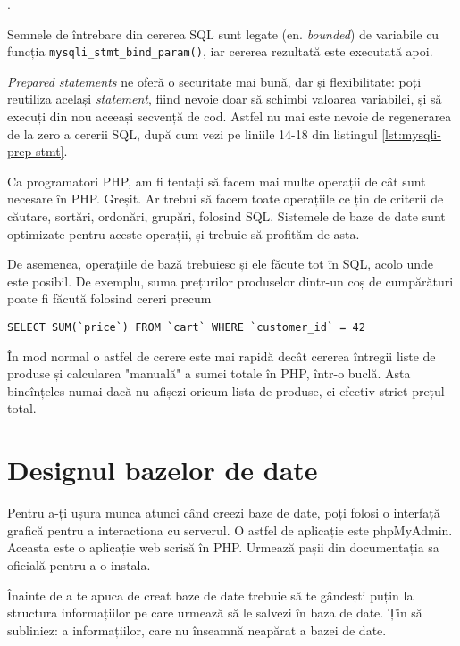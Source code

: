 .

Semnele de întrebare din cererea SQL sunt legate (en. \textsl{bounded})
de variabile cu funcția \texttt{mysqli\_stmt\_bind\_param()}, iar
cererea rezultată este executată apoi.

\textit{Prepared statements} ne oferă o securitate mai bună, dar și flexibilitate:
poți reutiliza același \textit{statement}, fiind nevoie doar să schimbi
valoarea variabilei, și să execuți din nou aceeași secvență de cod. Astfel
nu mai este nevoie de regenerarea de la zero a cererii SQL, după cum
vezi pe liniile 14-18 din listingul \ref{lst:mysqli-prep-stmt}.

Ca programatori PHP, am fi tentați să facem mai multe operații
de cât sunt necesare în PHP. Greșit. Ar trebui să facem toate
operațiile ce țin de criterii de căutare, sortări, ordonări, grupări,
folosind SQL. Sistemele de baze de date sunt optimizate pentru aceste
operații, și trebuie să profităm de asta.

De asemenea, operațiile de bază trebuiesc și ele făcute tot în SQL, acolo
unde este posibil. De exemplu, suma prețurilor produselor dintr-un
coș de cumpărături poate fi făcută folosind cereri precum

\begin{lstlisting}
SELECT SUM(`price`) FROM `cart` WHERE `customer_id` = 42
\end{lstlisting}

În mod normal o astfel de cerere este mai rapidă decât cererea
întregii liste de produse și calcularea "manuală" a sumei totale
în PHP, într-o buclă. Asta bineînțeles numai dacă nu afișezi
oricum lista de produse, ci efectiv strict prețul total.


\section{Designul bazelor de date}
Pentru a-ți ușura munca atunci când creezi baze de date, poți folosi o interfață grafică
pentru a interacționa cu serverul. O astfel de aplicație este phpMyAdmin.
Aceasta este o aplicație web scrisă în PHP.
Urmează pașii
din documentația sa oficială pentru a o instala.

Înainte de a te apuca de creat baze de date trebuie să te gândești puțin
la structura informațiilor pe care urmează să le salvezi în baza de date.
Țin să subliniez: a informațiilor, care nu înseamnă neapărat a bazei de date.

